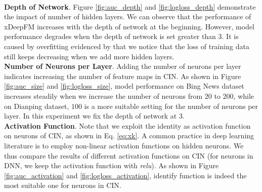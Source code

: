  \\\indent\textbf{Depth of Network}. Figure \ref{fig:auc_depth} and \ref{fig:logloss_depth} demonstrate the impact of number of hidden layers. We can observe that the performance of xDeepFM increases with the depth of network at the beginning. However, model performance degrades when the depth of network is set greater than 3. It is caused by overfitting evidenced by that we notice that the loss of training data still keeps decreasing when we add more hidden layers.
 \\\indent\textbf{Number of Neurons per Layer}. Adding the number of neurons per layer indicates increasing the number of feature maps in CIN. As shown in Figure \ref{fig:auc_size} and \ref{fig:logloss_size}, model performance on Bing News dataset increases steadily when we increase the number of neurons from $20$ to $200$, while on Dianping dataset, $100$ is a more suitable setting for the number of neurons per layer. In this experiment we fix the depth of network at 3.
 \\\indent\textbf{Activation Function}. Note that we exploit the identity as activation function on neurons of CIN, as shown in Eq. \ref{eq:xk}. A common practice in deep learning literature is to employ non-linear activation functions on hidden neurons. We thus compare the results of different activation functions on CIN (for neurons in DNN, we keep the activation function with \textsl{relu}). As shown in Figure \ref{fig:auc_activation} and \ref{fig:logloss_activation}, identify function is indeed the most suitable one for neurons in CIN.
